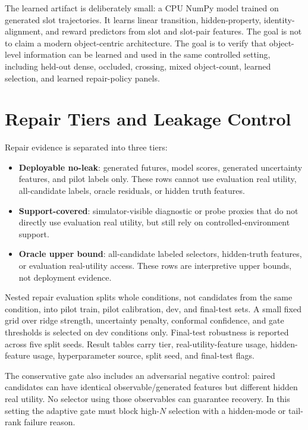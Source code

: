 \documentclass[10pt]{article}
\begin{document}
The learned artifact is deliberately small: a CPU NumPy model trained on generated slot trajectories. It learns linear transition, hidden-property, identity-alignment, and reward predictors from slot and slot-pair features. The goal is not to claim a modern object-centric architecture. The goal is to verify that object-level information can be learned and used in the same controlled setting, including held-out dense, occluded, crossing, mixed object-count, learned selection, and learned repair-policy panels.

\section{Repair Tiers and Leakage Control}

Repair evidence is separated into three tiers:
\begin{itemize}
  \item \textbf{Deployable no-leak}: generated futures, model scores, generated uncertainty features, and pilot labels only. These rows cannot use evaluation real utility, all-candidate labels, oracle residuals, or hidden truth features.
  \item \textbf{Support-covered}: simulator-visible diagnostic or probe proxies that do not directly use evaluation real utility, but still rely on controlled-environment support.
  \item \textbf{Oracle upper bound}: all-candidate labeled selectors, hidden-truth features, or evaluation real-utility access. These rows are interpretive upper bounds, not deployment evidence.
\end{itemize}

Nested repair evaluation splits whole conditions, not candidates from the same condition, into pilot train, pilot calibration, dev, and final-test sets. A small fixed grid over ridge strength, uncertainty penalty, conformal confidence, and gate thresholds is selected on dev conditions only. Final-test robustness is reported across five split seeds. Result tables carry tier, real-utility-feature usage, hidden-feature usage, hyperparameter source, split seed, and final-test flags.

The conservative gate also includes an adversarial negative control: paired candidates can have identical observable/generated features but different hidden real utility. No selector using those observables can guarantee recovery. In this setting the adaptive gate must block high-$N$ selection with a hidden-mode or tail-rank failure reason.
\end{document}
